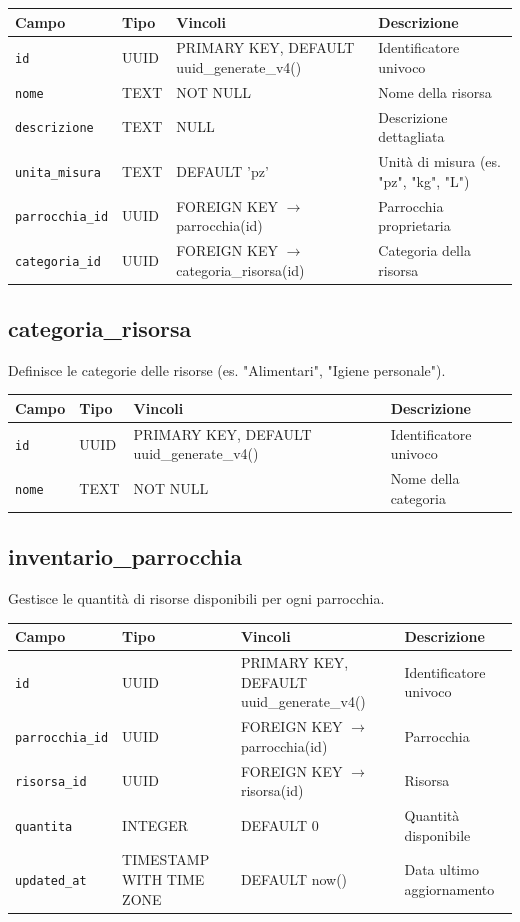 \documentclass[11pt,a4paper]{article}
\begin{document}
\begin{longtable}{p{3cm}p{3cm}p{4cm}p{5cm}}
\toprule
\textbf{Campo} & \textbf{Tipo} & \textbf{Vincoli} & \textbf{Descrizione} \\
\midrule
\texttt{id} & UUID & PRIMARY KEY, DEFAULT uuid\_generate\_v4() & Identificatore univoco \\
\texttt{nome} & TEXT & NOT NULL & Nome della risorsa \\
\texttt{descrizione} & TEXT & NULL & Descrizione dettagliata \\
\texttt{unita\_misura} & TEXT & DEFAULT 'pz' & Unità di misura (es. "pz", "kg", "L") \\
\texttt{parrocchia\_id} & UUID & FOREIGN KEY $\rightarrow$ parrocchia(id) & Parrocchia proprietaria \\
\texttt{categoria\_id} & UUID & FOREIGN KEY $\rightarrow$ categoria\_risorsa(id) & Categoria della risorsa \\
\end{longtable}

\subsection{categoria\_risorsa}
Definisce le categorie delle risorse (es. "Alimentari", "Igiene personale").

\begin{longtable}{p{3cm}p{3cm}p{4cm}p{5cm}}
\toprule
\textbf{Campo} & \textbf{Tipo} & \textbf{Vincoli} & \textbf{Descrizione} \\
\midrule
\texttt{id} & UUID & PRIMARY KEY, DEFAULT uuid\_generate\_v4() & Identificatore univoco \\
\texttt{nome} & TEXT & NOT NULL & Nome della categoria \\
\end{longtable}

\subsection{inventario\_parrocchia}
Gestisce le quantità di risorse disponibili per ogni parrocchia.

\begin{longtable}{p{3cm}p{3cm}p{4cm}p{5cm}}
\toprule
\textbf{Campo} & \textbf{Tipo} & \textbf{Vincoli} & \textbf{Descrizione} \\
\midrule
\texttt{id} & UUID & PRIMARY KEY, DEFAULT uuid\_generate\_v4() & Identificatore univoco \\
\texttt{parrocchia\_id} & UUID & FOREIGN KEY $\rightarrow$ parrocchia(id) & Parrocchia \\
\texttt{risorsa\_id} & UUID & FOREIGN KEY $\rightarrow$ risorsa(id) & Risorsa \\
\texttt{quantita} & INTEGER & DEFAULT 0 & Quantità disponibile \\
\texttt{updated\_at} & TIMESTAMP WITH TIME ZONE & DEFAULT now() & Data ultimo aggiornamento \\
\end{longtable}
\end{document}
